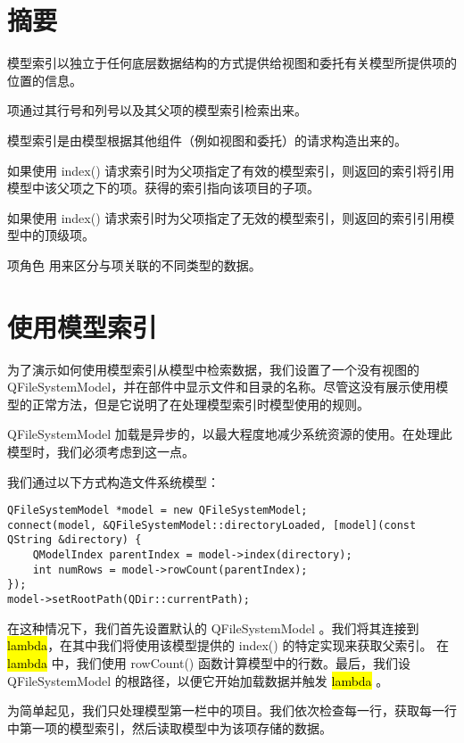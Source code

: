 \section{摘要}

\begin{compactitem}
\item 模型索引以独立于任何底层数据结构的方式提供给视图和委托有关模型所提供项的位置的信息。
\item 项通过其行号和列号以及其父项的模型索引检索出来。
\item 模型索引是由模型根据其他组件（例如视图和委托）的请求构造出来的。
\item 如果使用 index() 请求索引时为父项指定了有效的模型索引，则返回的索引将引用模型中该父项之下的项。获得的索引指向该项目的子项。
\item 如果使用 index() 请求索引时为父项指定了无效的模型索引，则返回的索引引用模型中的顶级项。
\item 项角色 用来区分与项关联的不同类型的数据。
\end{compactitem}

\section{使用模型索引}

为了演示如何使用模型索引从模型中检索数据，我们设置了一个没有视图的 QFileSystemModel，并在部件中显示文件和目录的名称。尽管这没有展示使用模型的正常方法，但是它说明了在处理模型索引时模型使用的规则。

QFileSystemModel 加载是异步的，以最大程度地减少系统资源的使用。在处理此模型时，我们必须考虑到这一点。

我们通过以下方式构造文件系统模型：

\begin{lstlisting}
QFileSystemModel *model = new QFileSystemModel;
connect(model, &QFileSystemModel::directoryLoaded, [model](const QString &directory) {
    QModelIndex parentIndex = model->index(directory);
    int numRows = model->rowCount(parentIndex);
});
model->setRootPath(QDir::currentPath);
\end{lstlisting}

在这种情况下，我们首先设置默认的 QFileSystemModel 。我们将其连接到 \hl{lambda}，在其中我们将使用该模型提供的 index() 的特定实现来获取父索引。 在 \hl{lambda} 中，我们使用 rowCount() 函数计算模型中的行数。最后，我们设 QFileSystemModel 的根路径，以便它开始加载数据并触发 \hl{lambda} 。

为简单起见，我们只处理模型第一栏中的项目。我们依次检查每一行，获取每一行中第一项的模型索引，然后读取模型中为该项存储的数据。

